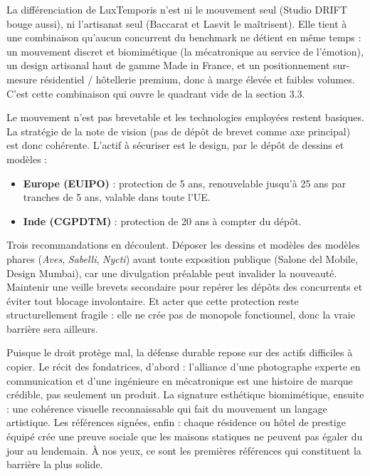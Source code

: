 \documentclass[11pt,a4paper]{article}
\begin{document}
La différenciation de LuxTemporis n'est ni le mouvement seul (Studio DRIFT bouge aussi), ni l'artisanat seul (Baccarat et Lasvit le maîtrisent). Elle tient à une combinaison qu'aucun concurrent du benchmark ne détient en même temps : un mouvement discret et biomimétique (la mécatronique au service de l'émotion), un design artisanal haut de gamme Made in France, et un positionnement sur-mesure résidentiel / hôtellerie premium, donc à marge élevée et faibles volumes. C'est cette combinaison qui ouvre le quadrant vide de la section 3.3.


Le mouvement n'est pas brevetable et les technologies employées restent basiques. La stratégie de la note de vision (pas de dépôt de brevet comme axe principal) est donc cohérente. L'actif à sécuriser est le design, par le dépôt de dessins et modèles :

\begin{itemize}
  \item \textbf{Europe (EUIPO)} : protection de 5 ans, renouvelable jusqu'à 25 ans par tranches de 5 ans, valable dans toute l'UE.
  \item \textbf{Inde (CGPDTM)} : protection de 20 ans à compter du dépôt.
\end{itemize}

Trois recommandations en découlent. Déposer les dessins et modèles des modèles phares (\textit{Aves}, \textit{Sabelli}, \textit{Nycti}) avant toute exposition publique (Salone del Mobile, Design Mumbai), car une divulgation préalable peut invalider la nouveauté. Maintenir une veille brevets secondaire pour repérer les dépôts des concurrents et éviter tout blocage involontaire. Et acter que cette protection reste structurellement fragile : elle ne crée pas de monopole fonctionnel, donc la vraie barrière sera ailleurs.


Puisque le droit protège mal, la défense durable repose sur des actifs difficiles à copier. Le récit des fondatrices, d'abord : l'alliance d'une photographe experte en communication et d'une ingénieure en mécatronique est une histoire de marque crédible, pas seulement un produit. La signature esthétique biomimétique, ensuite : une cohérence visuelle reconnaissable qui fait du mouvement un langage artistique. Les références signées, enfin : chaque résidence ou hôtel de prestige équipé crée une preuve sociale que les maisons statiques ne peuvent pas égaler du jour au lendemain. À nos yeux, ce sont les premières références qui constituent la barrière la plus solide.
\end{document}
